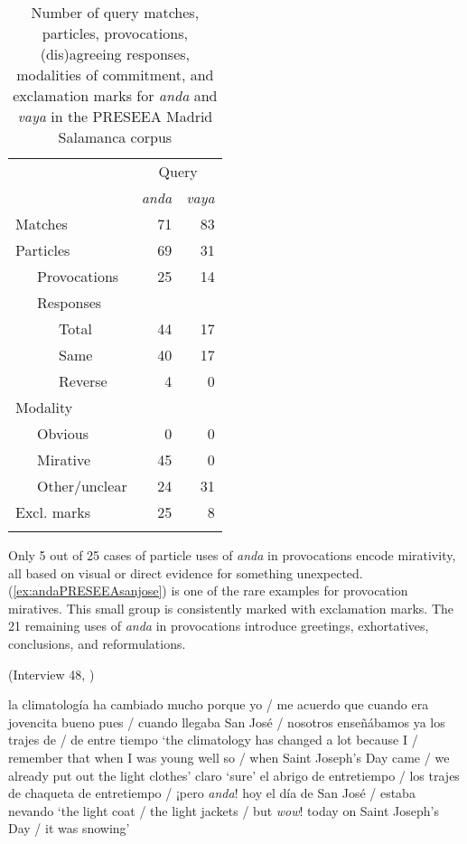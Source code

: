 \begin{table}
\begin{tabular}{lrr}
\lsptoprule
               &  \multicolumn{2}{c}{Query}\\\cmidrule(lr){2-3}
               &  \itshape anda   & \itshape  vaya\\\midrule
Matches        &   71    &  83 \\
Particles      &   69    &  31 \\
~~~Provocations   &   25    &  14 \\
~~~Responses      &         &     \\
~~~~~~Total        &   44    &  17 \\
~~~~~~Same         &   40    &  17 \\
~~~~~~Reverse      &   4     &  0  \\
Modality       &         &     \\
~~~Obvious     &   0     &  0  \\
~~~Mirative    &   45    &  0  \\
~~~Other/unclear  &    24   &  31 \\
Excl. marks    &    25   &   8 \\
\lspbottomrule
\end{tabular}
\caption{Number of query matches, particles, provocations, (dis)agreeing responses, modalities of commitment, and exclamation marks for \textit{anda} and \textit{vaya} in the PRESEEA Madrid Salamanca corpus\label{tab:corpusparticlesANDAVAYA}}
\end{table}

Only 5 out of 25 cases of particle uses of \textit{anda} in provocations encode mirativity, all based on visual or direct evidence for something unexpected. (\ref{ex:andaPRESEEAsanjose}) is one of the rare examples for provocation miratives. This small group is consistently marked with exclamation marks. The 21 remaining uses of \textit{anda} in provocations introduce greetings, exhortatives, conclusions, and reformulations.\pagebreak

\begin{exe} 
\ex (Interview 48, \cite{PRESEEA.20142020})\label{ex:andaPRESEEAsanjose} 
	\begin{xlist}[A:]
	 la climatología ha cambiado mucho porque yo / me acuerdo que cuan\-do era jovencita bueno pues / cuando llegaba San José / nosotros ense\-ñá\-ba\-mos ya los trajes de / de entre tiempo 
	\glt `the climatology has changed a lot because I / remember that when I was young well so / when Saint Joseph's Day came / we already put out the light clothes'
	 claro
	\glt `sure'
	 el abrigo de entretiempo / los trajes de chaqueta de entretiempo / ¡pero \textit{anda}! hoy el día de San José / estaba nevando 
	\glt `the light coat / the light jackets / but \textit{wow}! today on Saint Joseph's Day / it was snowing'
	\end{xlist}
\end{exe}

